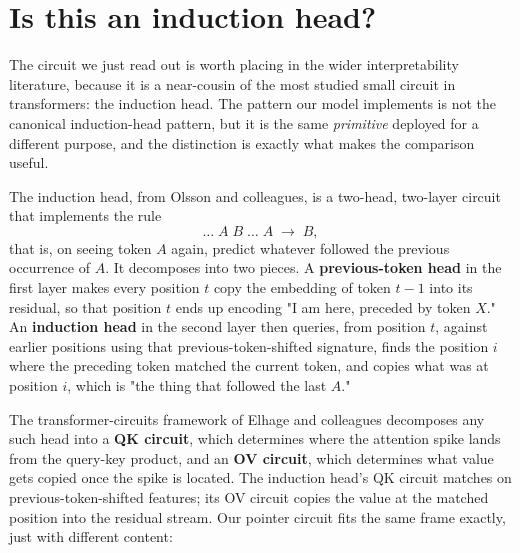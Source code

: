 
\section{Is this an induction head?}\label{sec:induction-head}

The circuit we just read out is worth placing in the wider interpretability
literature, because it is a near-cousin of the most studied small circuit in
transformers: the induction head. The pattern our model implements is not the
canonical induction-head pattern, but it is the same \emph{primitive} deployed
for a different purpose, and the distinction is exactly what makes the comparison
useful.

The induction head, from Olsson and colleagues, is a two-head, two-layer circuit
that implements the rule
\[
\ldots \; A \; B \; \ldots \; A \; \to \; B,
\]
that is, on seeing token $A$ again, predict whatever followed the previous
occurrence of $A$. It decomposes into two pieces. A \textbf{previous-token head}
in the first layer makes every position $t$ copy the embedding of token $t - 1$
into its residual, so that position $t$ ends up encoding "I am here, preceded by
token $X$." An \textbf{induction head} in the second layer then queries, from
position $t$, against earlier positions using that previous-token-shifted
signature, finds the position $i$ where the preceding token matched the current
token, and copies what was at position $i$, which is "the thing that followed the
last $A$."

The transformer-circuits framework of Elhage and colleagues decomposes any such
head into a \textbf{QK circuit}, which determines where the attention spike lands
from the query-key product, and an \textbf{OV circuit}, which determines what
value gets copied once the spike is located. The induction head's QK circuit
matches on previous-token-shifted features; its OV circuit copies the value at
the matched position into the residual stream. Our pointer circuit fits the same
frame exactly, just with different content:

